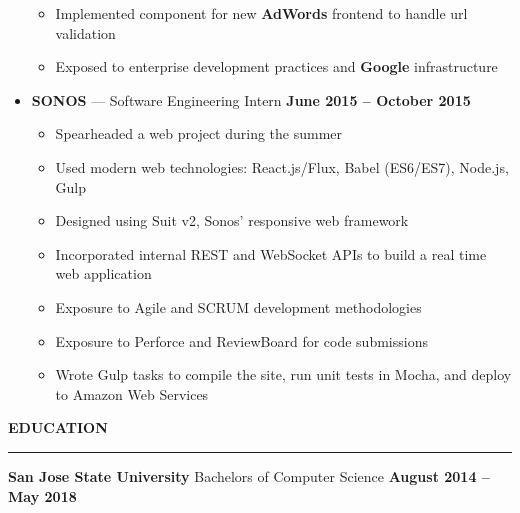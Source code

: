 \documentclass[10pt, oneside]{letter}
\newcommand{\linespaceshit} {
  \vspace{0.05in}
  \hrule
  \vspace{0.05in}
}
\begin{document}
\begin{adjustwidth}{0.1in}{0pt}
\begin{itemize}
\begin{itemize}
              \item {
                  Implemented component for new \textbf{AdWords} frontend to
                  handle url validation
              }
              \item {
                  Exposed to enterprise development practices and
                  \textbf{Google} infrastructure
              }
            \end{itemize}
        \item
          \textbf{SONOS} --- Software Engineering Intern \hfill \textbf{June 2015 -- October 2015}
            \begin{itemize}
              \item Spearheaded a web project during the summer
              \item {
                  Used modern web technologies: React.js/Flux, Babel (ES6/ES7),
                  Node.js, Gulp
              }
              \item Designed using Suit v2, Sonos' responsive web framework
              \item {
                  Incorporated internal REST and WebSocket APIs to build a real
                  time web application
              }
              \item Exposure to Agile and SCRUM development methodologies
              \item Exposure to Perforce and ReviewBoard for code submissions
              \item {
                  Wrote Gulp tasks to compile the site, run unit tests in
                  Mocha, and deploy to Amazon Web Services
              }
            \end{itemize}
      \end{itemize}

    \end{adjustwidth}

  \textbf{EDUCATION}
  \linespaceshit
    \begin{adjustwidth}{0.1in}{0pt}
      \textbf{San Jose State University} \hfill Bachelors of Computer Science \hfill \textbf{August 2014 -- May 2018}
    \end{adjustwidth}
\end{document}
